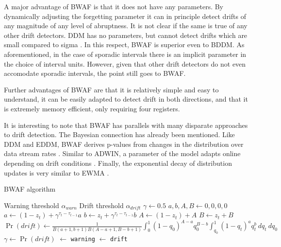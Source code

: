 A major advantage of BWAF is that it does not have any parameters. By dynamically adjusting the forgetting parameter it can in principle detect drifts of any magnitude of any level of abruptness. It is not clear if the same is true of any other drift detectors. DDM has no parameters, but cannot detect drifts which are small compared to sigma \cite{DDM}. In this respect, BWAF is superior even to BDDM. As aforementioned, in the case of sporadic intervals there is an implicit parameter in the choice of interval units. However, given that other drift detectors do not even accomodate sporadic intervals, the point still goes to BWAF. 

Further advantages of BWAF are that it is relatively simple and easy to understand, it can be easily adapted to detect drift in both directions, and that it is extremely memory efficient, only requiring four registers. 

It is interesting to note that BWAF has parallels with many disparate approaches to drift detection. The Bayesian connection has already been mentioned. Like DDM and EDDM, BWAF derives p-values from changes in the distribution over data stream rates \cite{DDM}\cite{EDDM}. Similar to ADWIN, a parameter of the model adapts online depending on drift conditions \cite{ADWIN}. Finally, the exponential decay of distribution updates is very similar to EWMA \cite{EWMA}. 

\begin{algorithm}
    \caption{BWAF algorithm}
    \label{alg:bwaf}
    \begin{algorithmic}
        \Require Warning threshold $\alpha_{warn}$
        \Require Drift threshold $\alpha_{drift}$
        \State $\gamma \gets 0.5$
        \State $a,b,A,B \gets 0,0,0,0$
          \State $a \gets (1-z_t) + \gamma^{\tau_t-\tau_{t-1}} a$
          \State $b \gets z_t + \gamma^{\tau_t-\tau_{t-1}} b$
          \State $A \gets (1-z_t) + A$
          \State $B \gets z_t + B$
          \State $\Pr(drift) \gets \frac{1}{B(a+1,b+1)B(A-a+1,B-b+1)}\int_0^1 (1-q_0)^{A-a}q_0^{B-b} \int_{q_0}^1 (1-q_t)^aq_t^b ~dq_t ~ dq_0$
          \State $\gamma \gets \Pr(drift)$
             $\gets$ {\tt warning}
             $\gets$ {\tt drift}
          \EndIf
        \EndFor
    \end{algorithmic}
\end{algorithm}

